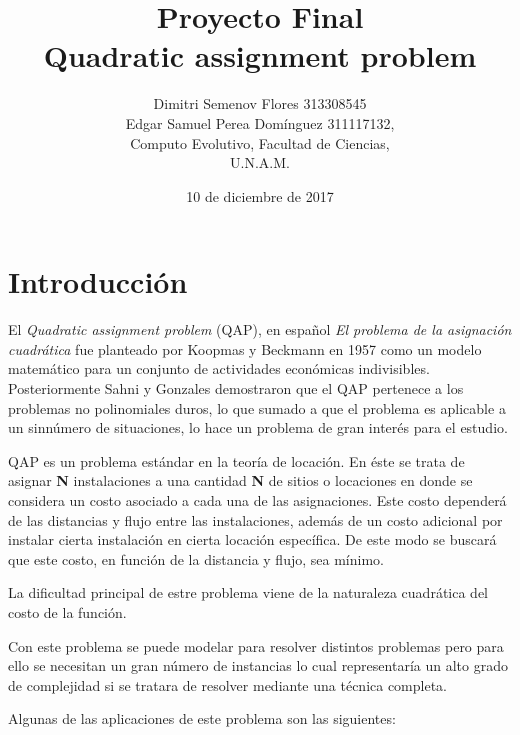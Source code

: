 \documentclass[12pts,letterpaper]{article}
\begin{document}
	\title{Proyecto Final \\ Quadratic assignment problem}
	\author{Dimitri Semenov Flores 313308545\\
	        Edgar Samuel Perea Domínguez 311117132,\\
	        Computo Evolutivo, Facultad de Ciencias,\\
	        U.N.A.M.}
	\date{10 de diciembre de 2017}
	\maketitle


	\section{Introducción}
		
		El \emph{Quadratic assignment problem} (QAP), en español \emph{El problema
		de la asignación cuadrática} fue planteado por Koopmas y Beckmann en 1957
		como un modelo matemático para un conjunto de actividades económicas indivisibles. 
		Posteriormente Sahni y Gonzales demostraron que el QAP pertenece a los
		problemas no polinomiales duros, lo que sumado a que el problema es
		aplicable a un sinnúmero de situaciones, lo hace un problema de gran
		interés para el estudio.
		
		
		QAP es un problema estándar en la teoría de locación.
		En éste se trata de asignar \textbf{N} instalaciones a una cantidad  \textbf{N} de sitios
		o locaciones en donde se considera un costo asociado a cada una de las
		asignaciones. Este costo dependerá de las distancias y flujo entre las
		instalaciones, además de un costo adicional por instalar cierta instalación
		en cierta locación específica. De este modo se buscará que este costo, en
		función de la distancia y flujo, sea mínimo.

		La dificultad principal de estre problema viene de la naturaleza cuadrática del costo de la función.
		
		
		Con este problema se puede modelar para resolver distintos problemas
		pero para ello se necesitan un gran número de instancias lo cual
		representaría un alto grado de complejidad si se tratara de resolver 
		mediante una técnica completa.
		
		
		Algunas de las aplicaciones de este problema son las siguientes:
\end{document}

